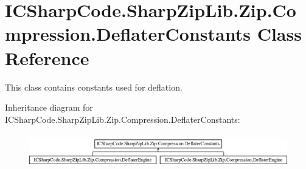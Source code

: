 \hypertarget{class_i_c_sharp_code_1_1_sharp_zip_lib_1_1_zip_1_1_compression_1_1_deflater_constants}{}\section{I\+C\+Sharp\+Code.\+Sharp\+Zip\+Lib.\+Zip.\+Compression.\+Deflater\+Constants Class Reference}
\label{class_i_c_sharp_code_1_1_sharp_zip_lib_1_1_zip_1_1_compression_1_1_deflater_constants}


This class contains constants used for deflation.  


Inheritance diagram for I\+C\+Sharp\+Code.\+Sharp\+Zip\+Lib.\+Zip.\+Compression.\+Deflater\+Constants\+:\begin{figure}[H]
\begin{center}
\leavevmode
\includegraphics[height=1.497326cm]{class_i_c_sharp_code_1_1_sharp_zip_lib_1_1_zip_1_1_compression_1_1_deflater_constants}
\end{center}
\end{figure}
